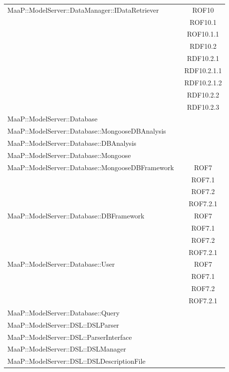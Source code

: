 \begin{center}
\begin{longtable}{|p{0.8\linewidth}|c|}
\midrule 
MaaP::ModelServer::DataManager::IDataRetriever
& ROF10\\
& ROF10.1\\
& ROF10.1.1\\
& RDF10.2\\
& RDF10.2.1\\
& RDF10.2.1.1\\
& RDF10.2.1.2\\
& RDF10.2.2\\
& RDF10.2.3\\

\midrule 
MaaP::ModelServer::Database
& \\

\midrule 
MaaP::ModelServer::Database::MongooseDBAnalysis
& \\

\midrule 
MaaP::ModelServer::Database::DBAnalysis
& \\

\midrule 
MaaP::ModelServer::Database::Mongoose
& \\

\midrule 
MaaP::ModelServer::Database::MongooseDBFramework
& ROF7\\
& ROF7.1\\
& ROF7.2\\
& ROF7.2.1\\

\midrule 
MaaP::ModelServer::Database::DBFramework
& ROF7\\
& ROF7.1\\
& ROF7.2\\
& ROF7.2.1\\

\midrule 
MaaP::ModelServer::Database::User
& ROF7\\
& ROF7.1\\
& ROF7.2\\
& ROF7.2.1\\

\midrule 
MaaP::ModelServer::Database::Query
& \\

\midrule 
MaaP::ModelServer::DSL::DSLParser
& \\

\midrule 
MaaP::ModelServer::DSL::ParserInterface
& \\

\midrule 
MaaP::ModelServer::DSL::DSLManager
& \\

\midrule 
MaaP::ModelServer::DSL::DSLDescriptionFile
& \\


\end{longtable}
\end{center}

